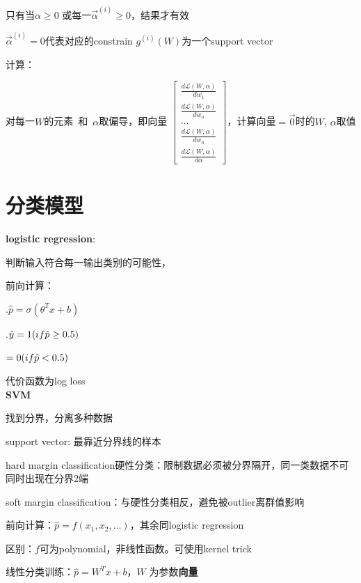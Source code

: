 \documentclass[UTF8]{ctexart}
\begin{document}
  \quad \quad 只有当$\alpha \geq 0$ 或每一$\vec{\alpha}^{(i)} \geq 0$，结果才有效

  \quad \quad $\vec{\alpha}^{(i)} = 0$代表对应的constrain $g^{(i)}(W)$为一个support vector

  计算：
  
  \quad 对每一$W$的元素\ 和\ $\alpha$取偏导，即向量
  $\begin{bmatrix}
    \frac{d \mathcal{L}(W, \alpha)}{d w_1}  \\
    \frac{d \mathcal{L}(W, \alpha)}{d w_n} \\
    ... \\
    \frac{d \mathcal{L}(W, \alpha)}{d w_n} \\
    \frac{d \mathcal{L}(W, \alpha)}{d \alpha}
  \end{bmatrix}$，计算向量$=\vec{0} $时的$W$, $\alpha$取值




\section{分类模型}
\noindent \textbf{logistic regression}:

  判断输入符合每一输出类别的可能性，

  前向计算：
  
  .$\hat{p} = \sigma(\theta^Tx + b)$

  .$\hat{y} = 1\space (if \hat{p} \geq 0.5)$

  \quad \quad \quad $= 0\space (if \hat{p} < 0.5)$

  代价函数为log loss\\
\textbf{SVM}

  找到分界，分离多种数据

  support vector: 最靠近分界线的样本

  hard margin classification硬性分类：限制数据必须被分界隔开，同一类数据不可同时出现在分界2端

  soft margin classification：与硬性分类相反，避免被outlier离群值影响

  前向计算：$\hat{p} = f(x_1, x_2,...)$，其余同logistic regression

  \quad 区别：$f$可为polynomial，非线性函数。可使用kernel trick

  线性分类训练：$\hat{p} = W^Tx + b$，$W$ 为参数\textbf{向量}
\end{document}
